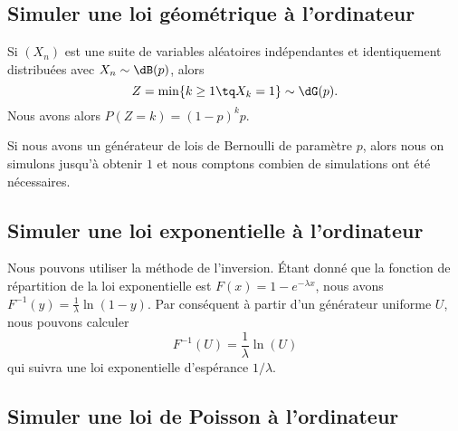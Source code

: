 \subsection{Simuler une loi géométrique à l'ordinateur}

Si \( (X_n)\) est une suite de variables aléatoires indépendantes et identiquement distribuées avec \( X_n\sim \dB(p)\), alors
\begin{equation}
    Z=\min\{ k\geq 1\tq X_k=1 \}\sim\dG(p).
\end{equation}
Nous avons alors \( P(Z=k)=(1-p)^kp\). 

Si nous avons un générateur de lois de Bernoulli de paramètre \( p\), alors nous on simulons jusqu'à obtenir \( 1\) et nous comptons combien de simulations ont été nécessaires.

\subsection{Simuler une loi exponentielle à l'ordinateur}

Nous pouvons utiliser la méthode de l'inversion. Étant donné que la fonction de répartition de la loi exponentielle est \( F(x)=1- e^{-\lambda x}\), nous avons \( F^{-1}(y)=\frac{1}{ \lambda }\ln(1-y)\). Par conséquent à partir d'un générateur uniforme \( U\), nous pouvons calculer
\begin{equation}
    F^{-1}(U)=\frac{1}{ \lambda }\ln(U)
\end{equation}
qui suivra une loi exponentielle d'espérance \( 1/\lambda\).

\subsection{Simuler une loi de Poisson à l'ordinateur}

